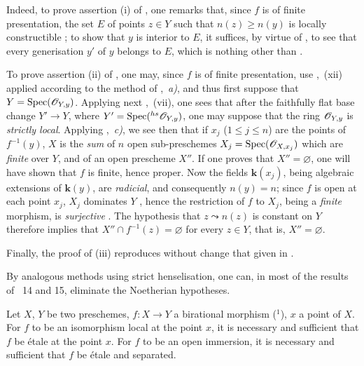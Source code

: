 Indeed, to prove assertion (i) of , one remarks that, since $f$ is of finite presentation, the set $E$ of points $z\in Y$ such that $n(z)\geq n(y)$ is locally constructible ; to show that $y$ is interior to $E$, it suffices, by virtue of , to see that every generisation $y'$ of $y$ belongs to $E$, which is nothing other than .

To prove assertion (ii) of , one may, since $f$ is of finite presentation, use ,~(xii) applied according to the method of ,~\emph{a)}, and thus first suppose that $Y=\operatorname{Spec}(\mathscr{O}_{Y,y})$. Applying next ,~(vii), one sees that after the faithfully flat base change $Y'\to Y$, where $Y'=\operatorname{Spec}({}^{hs}\mathscr{O}_{Y,y})$, one may suppose that the ring $\mathscr{O}_{Y,y}$ is \emph{strictly local}.
Applying ,~\emph{c)}, we see then that if $x_j$ ($1\leq j\leq n$) are the points of $f^{-1}(y)$, $X$ is the \emph{sum} of $n$ open sub-preschemes $X_j=\operatorname{Spec}(\mathscr{O}_{X,x_j})$ which are \emph{finite} over $Y$, and of an open prescheme $X''$.
If one proves that $X''=\varnothing$, one will have shown that $f$ is finite, hence proper. Now the fields $\boldsymbol{k}(x_j)$, being algebraic extensions of $\boldsymbol{k}(y)$, are \emph{radicial}, and consequently $n(y)=n$; since $f$ is open at each point $x_j$, $X_j$ dominates $Y$ , hence the restriction of $f$ to $X_j$, being a \emph{finite} morphism, is \emph{surjective} . The hypothesis that $z\leadsto n(z)$ is constant on $Y$ therefore implies that $X''\cap f^{-1}(z)=\varnothing$ for every $z\in Y$, that is, $X''=\varnothing$.

Finally, the proof of (iii) reproduces without change that given in .

\begin{env}[18.10.17.2]
\label{IV.18.10.17.2}
By analogous methods using strict henselisation, one can, in most of the results of \textsection\textsection~14 and 15, eliminate the Noetherian hypotheses.
\end{env}

\begin{lemma}[18.10.18]
\label{IV.18.10.18}
Let $X$, $Y$ be two preschemes, $f:X\to Y$ a birational morphism (${}^1$), $x$ a point of $X$.
For $f$ to be an isomorphism local at the point $x$, it is necessary and sufficient that $f$ be \'etale at the point $x$.
For $f$ to be an open immersion, it is necessary and sufficient that $f$ be \'etale and separated.
\end{lemma}

